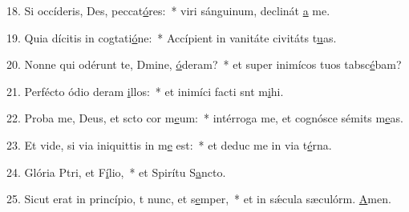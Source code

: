 18. Si occíderis, Des, peccat\uline{ó}res:~* viri sánguinum, declinát \uline{a} me.\par 
19. Quia dícitis in cogtati\uline{ó}ne:~* Accípient in vanitáte civitáts t\uline{u}as.\par 
20. Nonne qui odérunt te, Dmine, \uline{ó}deram?~* et super inimícos tuos tabsc\uline{é}bam?\par 
21. Perfécto ódio deram \uline{i}llos:~* et inimíci facti snt m\uline{i}hi.\par 
22. Proba me, Deus, et scto cor m\uline{e}um:~* intérroga me, et cognósce sémits m\uline{e}as.\par 
23. Et vide, si via iniquittis in m\uline{e} est:~* et deduc me in via t\uline{é}rna.\par 
24. Glória Ptri, et F\uline{í}lio,~* et Spirítu S\uline{a}ncto.\par 
25. Sicut erat in princípio, t nunc, et s\uline{e}mper,~* et in sǽcula sæculórm. \uline{A}men.\par 
